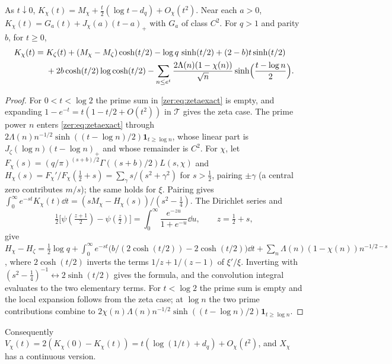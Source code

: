 \begin{lemma}\label{zer:lem:cusp}
As $t\downarrow0$, $K_\chi(t)=M_\chi+\tfrac t2(\log t-d_q)+O_\chi(t^2)$. Near each $a>0$,
$K_\chi(t)=G_a(t)+J_\chi(a)(t-a)_+$ with $G_a$ of class $C^2$. For $q>1$ and parity $b$, for $t\ge0$,
\begin{align*}
 K_\chi(t)={}&K_\zeta(t)+(M_\chi-M_\zeta)\cosh(t/2)-\log q\,\sinh(t/2)
 +(2-b)t\sinh(t/2)\\
 &+2b\cosh(t/2)\log\cosh(t/2)-\sum_{n\le e^t}\frac{2\Lambda(n)(1-\chi(n))}{\sqrt n}\sinh\Bigl(\frac{t-\log n}2\Bigr).
\end{align*}
\end{lemma}
\begin{proof}
For $0<t<\log2$ the prime sum in \eqref{zer:eq:zetaexact} is empty, and expanding
$1-e^{-t}=t(1-t/2+O(t^2))$ in $\mathcal T$ gives the zeta case. The prime power $n$ enters
\eqref{zer:eq:zetaexact} through $2\Lambda(n)n^{-1/2}\sinh((t-\log n)/2)\mathbf 1_{t\ge\log n}$, whose linear
part is $J_\zeta(\log n)(t-\log n)_+$ and whose remainder is $C^2$. For $\chi$, let
$F_\chi(s)=(q/\pi)^{(s+b)/2}\Gamma((s+b)/2)L(s,\chi)$ and $H_\chi(s)=F_\chi'/F_\chi(\tfrac12+s)=\sum_\gamma s/(s^2+\gamma^2)$
for $s>\tfrac12$, pairing $\pm\gamma$ (a central zero contributes $m/s$); the same holds for $\xi$. Pairing
gives $\int_0^\infty e^{-st}K_\chi(t)\dd t=(sM_\chi-H_\chi(s))/(s^2-\tfrac14)$. The Dirichlet series and
\[
 \tfrac12\bigl[\psi(\tfrac{z+1}2)-\psi(\tfrac z2)\bigr]=\int_0^\infty\frac{e^{-zu}}{1+e^{-u}}\dd u,\qquad z=\tfrac12+s,
\]
give $H_\chi-H_\zeta=\tfrac12\log q+\int_0^\infty e^{-st}\bigl(b/(2\cosh(t/2))-2\cosh(t/2)\bigr)\dd t
+\sum_n\Lambda(n)(1-\chi(n))n^{-1/2-s}$, where $2\cosh(t/2)$ inverts the terms $1/z+1/(z-1)$ of
$\xi'/\xi$. Inverting with $(s^2-\tfrac14)^{-1}\leftrightarrow2\sinh(t/2)$ gives the formula, and the
convolution integral evaluates to the two elementary terms. For $t<\log2$ the prime sum is empty
and the local expansion follows from the zeta case; at $\log n$ the two prime contributions
combine to $2\chi(n)\Lambda(n)n^{-1/2}\sinh((t-\log n)/2)\mathbf 1_{t\ge\log n}$.
\end{proof}

Consequently $V_\chi(t)=2(K_\chi(0)-K_\chi(t))=t(\log(1/t)+d_q)+O_\chi(t^2)$, and $X_\chi$ has a
continuous version.

